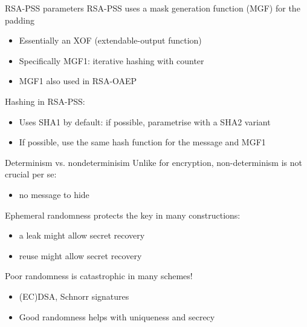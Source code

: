 \begin{frame}{RSA-PSS parameters}
  RSA-PSS uses a mask generation function (MGF) for the padding
  \begin{itemize}[<+(1)->]
    \item Essentially an XOF (extendable-output function)
    \item Specifically MGF1: iterative hashing with counter
    \item MGF1 also used in RSA-OAEP
  \end{itemize}

  \vfill

  \pause
  Hashing in RSA-PSS:
  \begin{itemize}[<+(1)->]
    \item Uses SHA1 by default: if possible, parametrise with a SHA2 variant
    \item If possible, use the same hash function for the message and MGF1
  \end{itemize}
\end{frame}

\begin{frame}{Determinism vs. nondeterminisim}
  \pause
  Unlike for encryption, non-determinism is not crucial per se:
  \begin{itemize}[<+(1)->]
    \item no message to hide
  \end{itemize}

  \vspace*{1em}

  \pause
  Ephemeral randomness protects the key in many constructions:
  \begin{itemize}[<+(1)->]
    \item a leak might allow secret recovery
    \item reuse might allow secret recovery
  \end{itemize}

  \pause
  Poor randomness is catastrophic in many schemes!
  \begin{itemize}[<+(1)->]
    \item (EC)DSA, Schnorr signatures
    \item Good randomness helps with uniqueness and secrecy
  \end{itemize}
\end{frame}

